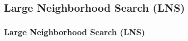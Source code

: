 \documentclass[aspectratio=1610]{beamer}
\begin{document}
\subsection{Large Neighborhood Search (LNS)}


\begin{frame}
  \frametitle{Large Neighborhood Search (LNS)}

\begin{minipage}[t]{0.3\linewidth}
\begin{figure}
	\centering

\end{figure}
\end{minipage}
\end{frame}
\end{document}
